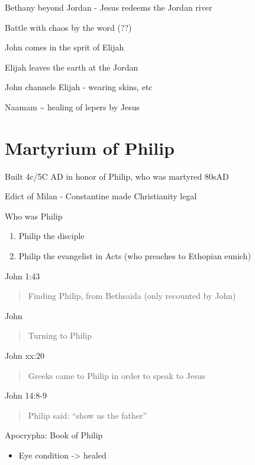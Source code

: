 \documentclass[
]{book}
\providecommand{\tightlist}{%
  \setlength{\itemsep}{0pt}\setlength{\parskip}{0pt}}
\begin{document}
Bethany beyond Jordan - Jesus redeems the Jordan river

Battle with chaos by the word (??)

John comes in the sprit of Elijah

Elijah leaves the earth at the Jordan

John channels Elijah - wearing skins, etc

Naamam \textasciitilde{} healing of lepers by Jesus

\hypertarget{martyrium-of-philip}{%
\chapter{Martyrium of Philip}\label{martyrium-of-philip}}

Built 4c/5C AD in honor of Philip, who was martyred 80sAD

Edict of Milan - Constantine made Christianity legal

Who was Philip

\begin{enumerate}
\def\labelenumi{\arabic{enumi})}
\tightlist
\item
  Philip the disciple
\item
  Philip the evangelist in Acts (who preaches to Ethopian eunich)
\end{enumerate}

John 1:43

\begin{quote}
Finding Philip, from Bethsaida (only recounted by John)
\end{quote}

John

\begin{quote}
Turning to Philip
\end{quote}

John xx:20

\begin{quote}
Greeks came to Philip in order to speak to Jesus
\end{quote}

John 14:8-9

\begin{quote}
Philip said: ``show us the father''
\end{quote}

Apocrypha: Book of Philip

\begin{itemize}
\tightlist
\item
  Eye condition -\textgreater{} healed
\end{itemize}
\end{document}
